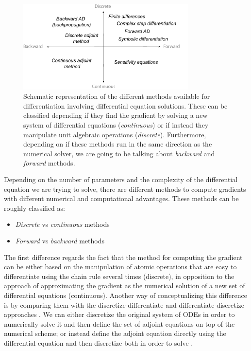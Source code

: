 \begin{figure}[]
    \centering
    \includegraphics[width=0.80\textwidth]{figures/scheme-methods.pdf}
    \caption{Schematic representation of the different methods available for differentiation involving differential equation solutions. These can be classified depending if they find the gradient by solving a new system of differential equations (\textit{continuous}) or if instead they manipulate unit algebraic operations (\textit{discrete}). Furthermore, depending on if these methods run in the same direction as the numerical solver, we are going to be talking about \textit{backward} and \textit{forward} methods.}
    \label{fig:diff}
\end{figure}
Depending on the number of parameters and the complexity of the differential equation we are trying to solve, there are different methods to compute gradients with different numerical and computational advantages.
These methods can be roughly classified as:
\begin{itemize}
    \item \textit{Discrete} vs \textit{continuous} methods
    \item \textit{Forward} vs \textit{backward} methods
\end{itemize}
The first difference regards the fact that the method for computing the gradient can be either based on the manipulation of atomic operations that are easy to differentiate using the chain rule several times (discrete), in opposition to the approach of approximating the gradient as the numerical solution of a new set of differential equations (continuous).
Another way of conceptualizing this difference is by comparing them with the discretize-differentiate and differentiate-discretize approaches \cite{bradley2013pde, Onken_Ruthotto_2020, FATODE2014, Sirkes_Tziperman_1997}.   
We can either discretize the original system of ODEs in order to numerically solve it and then define the set of adjoint equations on top of the numerical scheme; or instead define the adjoint equation directly using the differential equation and then discretize both in order to solve \cite{Giles_Pierce_2000}.

